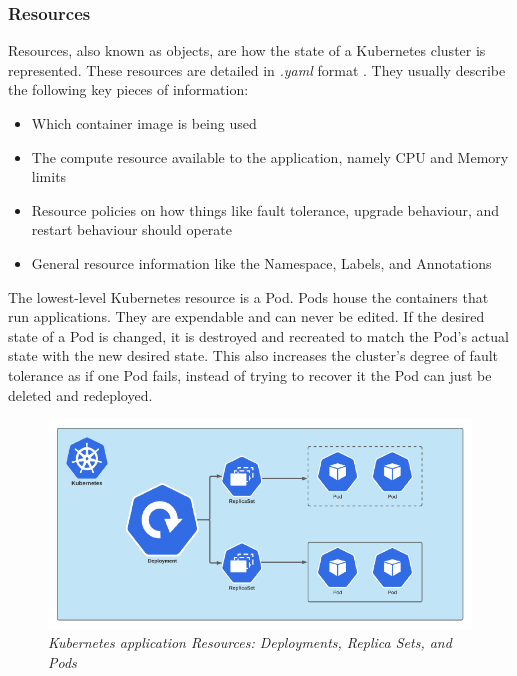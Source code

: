 \documentclass{article}
\begin{document}
\subsubsection{Resources} \label{resources}

Resources, also known as objects, are how the state of a Kubernetes cluster is represented. These resources are detailed in \emph{.yaml} format \cite{k8s-obj}. They usually describe the following key pieces of information:

\begin{itemize}
    \itemsep0em 
    \item Which container image is being used
    \item The compute resource available to the application, namely CPU and Memory limits
    \item Resource policies on how things like fault tolerance, upgrade behaviour, and restart behaviour should operate
    \item General resource information like the Namespace, Labels, and Annotations
\end{itemize}

The lowest-level Kubernetes resource is a Pod. Pods house the containers that run applications. They are expendable and can never be edited. If the desired state of a Pod is changed, it is destroyed and recreated to match the Pod's actual state with the new desired state. This also increases the cluster's degree of fault tolerance as if one Pod fails, instead of trying to recover it the Pod can just be deleted and redeployed. 

\begin{figure}[H]
    \centering
    \includegraphics[width=160mm]{tech/resource-struct.png}
    \caption{\emph{Kubernetes application Resources: Deployments, Replica Sets, and Pods}}
    \label{resource-struct}
\end{figure}
\end{document}
